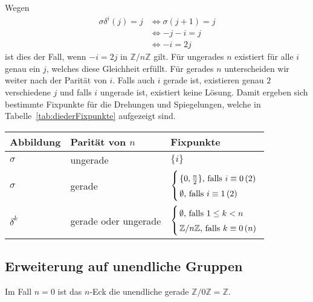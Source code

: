 \documentclass[12pt, german]{article}
\newcommand{\Z}{\mathbb{Z}}
\begin{document}
	Wegen
	\begin{align*}
		\sigma\delta^i(j)  = j &\iff \sigma(j+1)  = j  \\
		&\iff 	-j -i  = j \\
		&\iff 	-i  = 2j
	\end{align*} 
	ist dies der Fall, wenn $-i = 2j \textrm{ in } \mathbb Z /n \mathbb Z$ gilt. Für ungerades $n$ existiert für alle $i$ genau ein $j$, welches diese Gleichheit erfüllt. Für gerades $n$ unterscheiden wir weiter nach der Parität von $i$. Falls auch $i$ gerade ist, existieren genau $2$ verschiedene $j$ und falls $i$ ungerade ist, existiert keine Lösung. Damit ergeben sich bestimmte Fixpunkte für die Drehungen und Spiegelungen, welche in Tabelle~\ref{tab:diederFixpunkte} aufgezeigt sind.
	\begin{table*}[h]
		\centering
		\begin{tabular}{lll}
			\toprule[2pt]
			Abbildung & Parität von $n$ & Fixpunkte\\
			\midrule
			$\sigma$ & ungerade & $\{i\}$ \\
			\addlinespace
			$\sigma$ & gerade & $ \left \{
			
			\arraycolsep=1.4pt\def\arraystretch{1.5}
			\begin{array}{ll}
				\{0,\frac{n}{2}\}\textrm{, falls }i \equiv 0 \, (2)\\
				\emptyset\textrm{, falls } i \equiv 1\, (2)
			\end{array}
			\right. $ \\
			\addlinespace
			$\delta^k$ & gerade oder ungerade & $ \left \{
			\arraycolsep=1.4pt\def\arraystretch{1.5}
			\begin{array}{ll}
				\emptyset\textrm{, falls }1\leq k < n\\
				\Z/n\Z\textrm{, falls } k \equiv 0\, (n)
			\end{array}
			\right. $ \\
			\bottomrule[2pt]
		\end{tabular}
		\caption{Fixpunkte der Abbildungen in Diedergruppen.}
		\label{tab:diederFixpunkte}
	\end{table*}
	
	\subsection{Erweiterung auf unendliche Gruppen}
	
	Im Fall $n=0$ ist das $n$-Eck die unendliche gerade $\Z/0\Z = \Z$.
	
\end{document}
